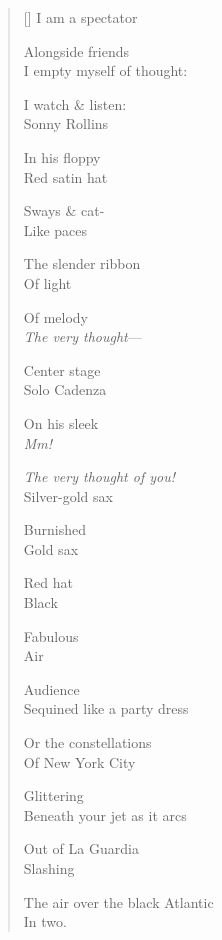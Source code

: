 \label{ch:as_you_leave}
\settowidth{\versewidth}{The air over the black Atlantic}
\begin{verse}[\versewidth]
I am a spectator

Alongside friends\\
I empty myself of thought:

I watch \& listen:\\
Sonny Rollins

In his floppy\\
Red satin hat

Sways \& cat-\\
Like paces

The slender ribbon\\
Of light

Of melody\\
\textit{The very thought}---

Center stage\\
Solo Cadenza

On his sleek\\
\textit{Mm!}

\textit{The very thought of you!}\\
Silver-gold sax

Burnished\\
Gold sax

Red hat\\
Black

Fabulous\\
Air

Audience\\
Sequined like a party dress

Or the constellations\\
Of New York City

Glittering\\
Beneath your jet as it arcs

Out of La Guardia\\
Slashing

The air over the black Atlantic\\
In two.
\end{verse}
